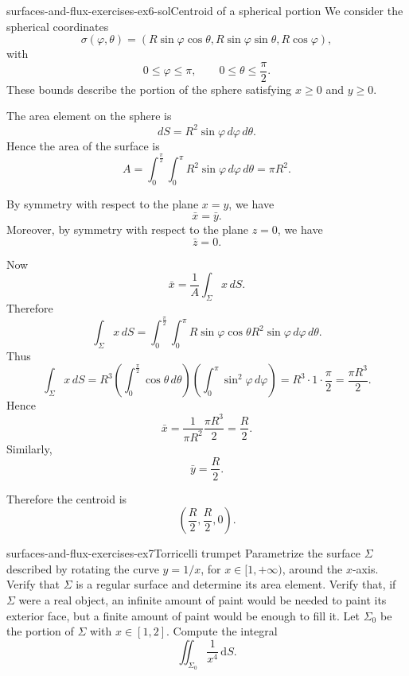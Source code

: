 \documentclass[preview]{standalone}
\begin{document}
\begin{snippetsolution}{surfaces-and-flux-exercises-ex6-sol}{Centroid of a spherical portion}
    We consider the spherical coordinates
    \[
        \sigma(\varphi,\theta)
        =
        (R\sin\varphi\cos\theta,
        R\sin\varphi\sin\theta,
        R\cos\varphi),
    \]
    with
    \[
        0\leq \varphi\leq \pi,
        \qquad
        0\leq \theta\leq \frac{\pi}{2}.
    \]
    These bounds describe the portion of the sphere satisfying \(x\geq 0\) and \(y\geq 0\).

    The area element on the sphere is
    \[
        dS=R^2\sin\varphi\,d\varphi\,d\theta.
    \]
    Hence the area of the surface is
    \[
        A
        =
        \int_0^{\frac{\pi}{2}}\int_0^\pi
        R^2\sin\varphi\,d\varphi\,d\theta
        =
        \pi R^2.
    \]

    By symmetry with respect to the plane \(x=y\), we have
    \[
        \bar{x}=\bar{y}.
    \]
    Moreover, by symmetry with respect to the plane \(z=0\), we have
    \[
        \bar{z}=0.
    \]

    Now
    \[
        \bar{x}
        =
        \frac{1}{A}\int_\Sigma x\,dS.
    \]
    Therefore
    \[
        \int_\Sigma x\,dS
        =
        \int_0^{\frac{\pi}{2}}\int_0^\pi
        R\sin\varphi\cos\theta
        R^2\sin\varphi
        \,d\varphi\,d\theta.
    \]
    Thus
    \[
        \int_\Sigma x\,dS
        =
        R^3
        \left(\int_0^{\frac{\pi}{2}}\cos\theta\,d\theta\right)
        \left(\int_0^\pi \sin^2\varphi\,d\varphi\right)
        =
        R^3\cdot 1\cdot \frac{\pi}{2}
        =
        \frac{\pi R^3}{2}.
    \]
    Hence
    \[
        \bar{x}
        =
        \frac{1}{\pi R^2}\frac{\pi R^3}{2}
        =
        \frac{R}{2}.
    \]
    Similarly,
    \[
        \bar{y}=\frac{R}{2}.
    \]

    Therefore the centroid is
    \[
        \left(\frac{R}{2},\frac{R}{2},0\right).
    \]
\end{snippetsolution}

\begin{snippetexercise}{surfaces-and-flux-exercises-ex7}{Torricelli trumpet}
    Parametrize the surface \(\Sigma\) described by rotating the curve \(y=1/x\), for \(x\in[1,+\infty)\), around the \(x\)-axis. Verify that \(\Sigma\) is a regular surface and determine its area element. Verify that, if \(\Sigma\) were a real object, an infinite amount of paint would be needed to paint its exterior face, but a finite amount of paint would be enough to fill it. Let \(\Sigma_0\) be the portion of \(\Sigma\) with \(x\in[1,2]\). Compute the integral \[\iint_{\Sigma_0}\frac{1}{x^4}\,\mathrm{d}S.\]
\end{snippetexercise}
\end{document}
